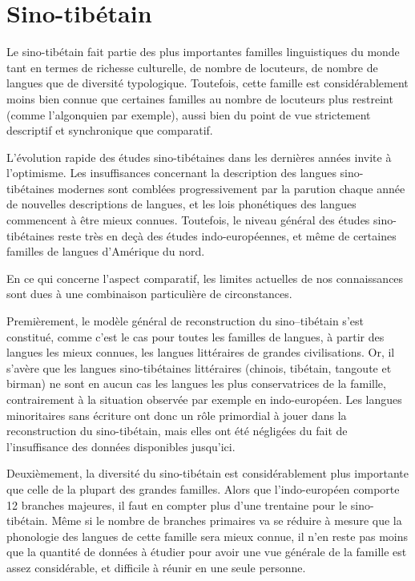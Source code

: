 \documentclass[oldfontcommands,oneside,a4paper,11pt]{memoir}
\begin{document}
\section{Sino-tibétain}
Le  sino-tibétain fait partie des plus importantes familles linguistiques du monde tant   en termes de richesse culturelle, de nombre de locuteurs, de nombre de langues que de diversité typologique. Toutefois, cette famille est considérablement moins bien connue que certaines familles au nombre de locuteurs plus restreint (comme l'algonquien par exemple), aussi bien du point de vue strictement descriptif et synchronique  que comparatif.

L'évolution rapide des études sino-tibétaines dans les dernières années invite à l'optimisme. Les insuffisances concernant la description des langues sino-tibétaines modernes sont comblées progressivement par la parution chaque année de nouvelles descriptions de langues, et les lois phonétiques des langues commencent à être mieux connues. Toutefois, le niveau général des études sino-tibétaines reste très en deçà des études indo-européennes, et même de certaines familles de langues d'Amérique du nord.

En ce qui concerne l'aspect comparatif, les limites actuelles de nos connaissances sont dues à une combinaison particulière de circonstances. 

Premièrement, le modèle général de reconstruction du sino--tibétain s'est constitué, comme c'est le cas pour toutes les familles de langues, à partir des langues les mieux connues, les langues littéraires de grandes civilisations. Or, il s'avère  que les langues sino-tibétaines littéraires (chinois, tibétain, tangoute et birman) ne sont en aucun cas les langues les plus conservatrices de la famille, contrairement à la situation observée par exemple en indo-européen. Les langues   minoritaires sans écriture ont donc un rôle primordial à jouer dans la reconstruction du sino-tibétain, mais elles ont été négligées du fait de l'insuffisance des données disponibles jusqu'ici.

Deuxièmement, la diversité du sino-tibétain est considérablement plus importante que celle de la plupart des grandes familles. Alors que l'indo-européen comporte 12 branches majeures, il faut en compter plus d'une trentaine pour le sino-tibétain. Même si le nombre de branches primaires va se réduire à mesure que la phonologie des langues de cette famille sera mieux connue, il n'en reste pas moins que la quantité de données à étudier pour avoir une vue générale de la famille est assez considérable, et difficile à réunir en une seule personne.
\end{document}
